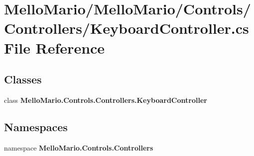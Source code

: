 \section{Mello\+Mario/\+Mello\+Mario/\+Controls/\+Controllers/\+Keyboard\+Controller.cs File Reference}
\label{KeyboardController_8cs}
\subsection*{Classes}
\begin{DoxyCompactItemize}
\item 
class \textbf{ Mello\+Mario.\+Controls.\+Controllers.\+Keyboard\+Controller}
\end{DoxyCompactItemize}
\subsection*{Namespaces}
\begin{DoxyCompactItemize}
\item 
namespace \textbf{ Mello\+Mario.\+Controls.\+Controllers}
\end{DoxyCompactItemize}
